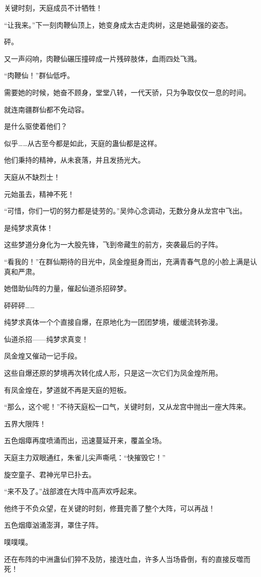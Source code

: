 \begin{this_body}
关键时刻，天庭成员不计牺牲！

“让我来。”下一刻肉鞭仙顶上，她变身成太古走肉树，这是她最强的姿态。

砰。

又一声闷响，肉鞭仙碾压撞碎成一片残碎肢体，血雨四处飞溅。

“肉鞭仙！”群仙低呼。

需要她的时候，她奋不顾身，堂堂八转，一代天骄，只为争取仅仅一息的时间。

就连南疆群仙都不免动容。

是什么驱使着他们？

似乎……从古至今都是如此，天庭的蛊仙都是这样。

他们秉持的精神，从未衰落，并且发扬光大。

天庭从不缺烈士！

元始虽去，精神不死！

“可惜，你们一切的努力都是徒劳的。”吴帅心念调动，无数分身从龙宫中飞出。

是纯梦求真体！

这些梦道分身化为一大股先锋，飞到帝藏生的前方，突袭最后的子阵。

“看我的！”在群仙期待的目光中，凤金煌挺身而出，充满青春气息的小脸上满是认真和严肃。

她借助仙阵的力量，催起仙道杀招碎梦。

砰砰砰……

纯梦求真体一个个直接自爆，在原地化为一团团梦境，缓缓流转弥漫。

仙道杀招——纯梦求真变！

凤金煌又催动一记手段。

这些自爆还原的梦境再次转化成人形，只是这一次它们为凤金煌所用。

有凤金煌在，梦道就不再是天庭的短板。

“那么，这个呢！”不待天庭松一口气，关键时刻，又从龙宫中抛出一座大阵来。

五界大限阵！

五色烟瘴再度喷涌而出，迅速蔓延开来，覆盖全场。

天庭主力双眼通红，朱雀儿尖声嘶吼：“快摧毁它！”

旋空童子、君神光早已扑去。

“来不及了。”战部渡在大阵中高声欢呼起来。

他终于不负众望，在关键的时刻，修葺完善了整个大阵，可以再战！

五色烟瘴汹涌澎湃，罩住子阵。

噗噗噗。

还在布阵的中洲蛊仙们猝不及防，接连吐血，许多人当场昏倒，有的直接反噬而死！


\end{this_body}
